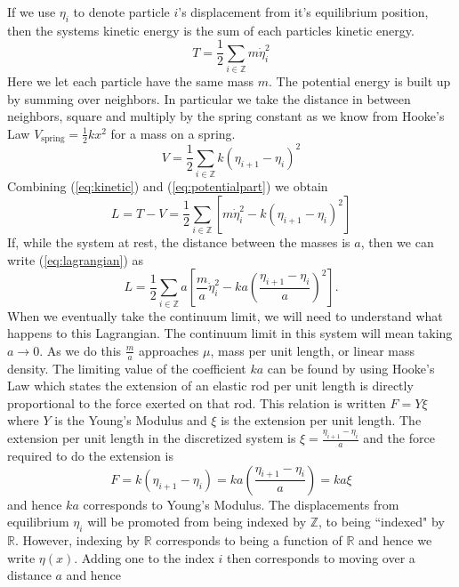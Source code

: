 If we use $\eta_i$ to denote particle $i$'s displacement from it's equilibrium position, then the systems kinetic energy is the sum of each particles kinetic energy.
\begin{equation}\label{eq:kinetic}
T = \frac{1}{2}\sum_{i\in\mathbb{Z}}m\dot{\eta}_i^2
\end{equation}
Here we let each particle have the same mass $m$. The potential energy is built up by summing over neighbors. In particular we take the distance in between neighbors, square and multiply by the spring constant as we know from Hooke's Law  $V_\text{spring} = \frac{1}{2}kx^2$ for a mass on a spring.
\begin{equation}\label{eq:potentialpart}
V = \frac{1}{2}\sum_{i\in\mathbb{Z}}k\left(\eta_{i + 1} - \eta_i\right)^2
\end{equation}
Combining (\ref{eq:kinetic}) and (\ref{eq:potentialpart}) we obtain
\begin{equation}\label{eq:lagrangian}
L = T - V = \frac{1}{2}\sum_{i\in\mathbb{Z}}\left[m\dot{\eta}_i^2 - k\left(\eta_{i + 1} - \eta_i\right)^2\right]
\end{equation}
If, while the system at rest, the distance between the masses is $a$, then we can write (\ref{eq:lagrangian}) as
\begin{equation}\label{eq:lagrangianMod}
L = \frac{1}{2}\sum_{i\in\mathbb{Z}}a\left[\frac{m}{a}\dot{\eta}_i^2 - ka\left(\frac{\eta_{i + 1} - \eta_i}{a}\right)^2\right].
\end{equation}
When we eventually take the continuum limit, we will need to understand what happens to this Lagrangian. The continuum limit in this system will mean taking $a\to 0$. As we do this $\frac{m}{a}$ approaches $\mu$, mass per unit length, or linear mass density. The limiting value of the coefficient $ka$ can be found by using Hooke's Law which states the extension of an elastic rod per unit length is directly proportional to the force exerted on that rod. This relation is written $F = Y\xi$ where $Y$ is the Young's Modulus and $\xi$ is the extension per unit length. The extension per unit length in the discretized system is $\xi = \frac{\eta_{i + 1} - \eta_i}{a}$ and the force required to do the extension is 
\begin{equation}\label{eq:youngsMod}
F = k(\eta_{i + 1} - \eta_i) = ka\left(\frac{\eta_{i + 1} - \eta_i}{a}\right) = ka\xi
\end{equation}
and hence $ka$ corresponds to Young's Modulus. The displacements from equilibrium $\eta_i$ will be promoted from being indexed by $\mathbb{Z}$, to being ``indexed" by $\mathbb{R}$. However, indexing by $\mathbb{R}$ corresponds to being a function of $\mathbb{R}$ and hence we write $\eta(x)$. Adding one to the index $i$ then corresponds to moving over a distance $a$ and hence
